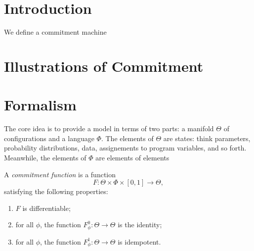 \documentclass{article}
\begin{document}
\section{Introduction}

We define a commitment machine



\section{Illustrations of Commitment}


\section{Formalism}
The core idea is to provide a model in terms of two parts: a manifold $\Theta$
of configurations and a language $\Phi$.
The elements of $\Theta$ are states: think parameters, probability distributions, data, assignements to program variables, and so forth.
Meanwhile, the elements of $\Phi$ are elements of elements

\begin{defn}
    A \emph{commitment function} is a function
    \[
        F: \Theta \times \Phi \times [0,1] \to \Theta,
    \]
    satisfying the following properties:
    \begin{enumerate}[nosep,label={CF\arabic*.}]
        \item $F$ is differentiable;
        \item for all $\phi$, the function $F^0_\phi : \Theta \to \Theta$ is the identity;
        \item for all $\phi$, the function $F^1_\phi : \Theta \to \Theta$ is idempotent.
    \end{enumerate}
\end{defn}
\end{document}
